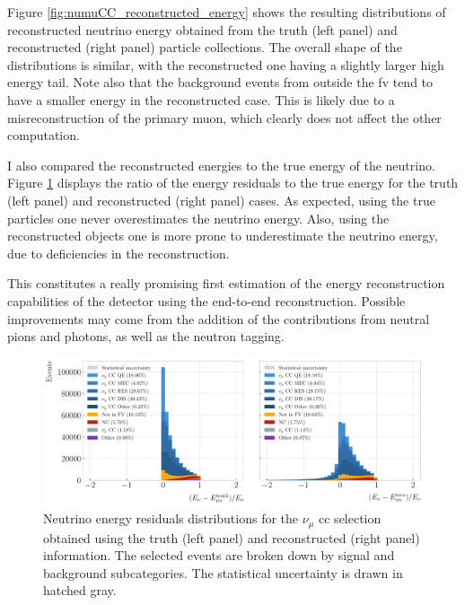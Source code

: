 Figure \ref{fig:numuCC_reconstructed_energy} shows the resulting distributions of reconstructed neutrino energy obtained from the truth (left panel) and reconstructed (right panel) particle collections. The overall shape of the distributions is similar, with the reconstructed one having a slightly larger high energy tail. Note also that the background events from outside the \gls{fv} tend to have a smaller energy in the reconstructed case. This is likely due to a misreconstruction of the primary muon, which clearly does not affect the other computation.

I also compared the reconstructed energies to the true energy of the neutrino. Figure \ref{fig:numuCC_reconstructed_fresiduals} displays the ratio of the energy residuals to the true energy for the truth (left panel) and reconstructed (right panel) cases. As expected, using the true particles one never overestimates the neutrino energy. Also, using the reconstructed objects one is more prone to underestimate the neutrino energy, due to deficiencies in the reconstruction.

This constitutes a really promising first estimation of the energy reconstruction capabilities of the detector using the end-to-end reconstruction. Possible improvements may come from the addition of the contributions from neutral pions and photons, as well as the neutron tagging.

\begin{figure}[t]
    \centering
    \includegraphics[width=.99\linewidth]{Images/GAr_selection/numuCC_selection_truth_reco_energy_fresiduals_comparison.pdf}
    \caption[Neutrino energy residuals distributions for the $\nu_{\mu}$ \gls{cc} selection obtained using the truth and reconstructed information]{Neutrino energy residuals distributions for the $\nu_{\mu}$ \gls{cc} selection obtained using the truth (left panel) and reconstructed (right panel) information. The selected events are broken down by signal and background subcategories. The statistical uncertainty is drawn in hatched gray.}
    \label{fig:numuCC_reconstructed_fresiduals}
\end{figure}

